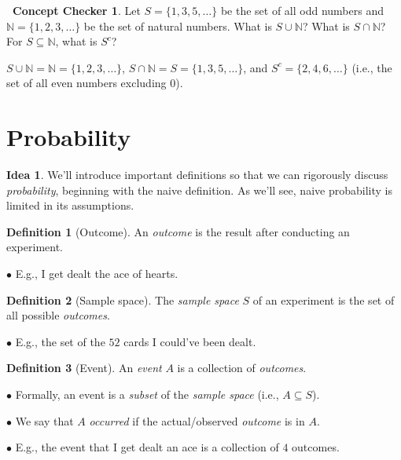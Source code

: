 \documentclass[12pt,oneside]{article}
\theoremstyle{definition}
\newtheorem{definition}{Definition}
\newtheorem{concept}{\faPen \ Concept Checker}
\newtheorem*{idea}{Idea}
\theoremstyle{remark}
\begin{document}
\begin{concept}
Let $S = \{1, 3, 5, \ldots\}$ be the set of all odd numbers and $\mathbb{N} = \{1, 2, 3, \ldots\}$ be the set of natural numbers. What is $S \cup \mathbb{N}$? What is $S \cap \mathbb{N}$? For $S \subseteq \mathbb{N}$, what is $S^c$?
\end{concept}

\begin{solutionbox}
$S \cup \mathbb{N} = \mathbb{N} = \{1, 2, 3, \ldots\}$, $S \cap \mathbb{N} = S = \{1, 3, 5, \ldots\}$, and $S^c = \{2, 4, 6, \ldots\}$ (i.e., the set of all even numbers excluding 0).
\end{solutionbox}

\section{Probability}

\begin{idea}
We'll introduce important definitions so that we can rigorously discuss \textit{probability}, beginning with the naive definition. As we'll see, naive probability is limited in its assumptions.
\end{idea}

\begin{definition}[Outcome]
An \textit{outcome} is the result after conducting an experiment.

$\bullet$ E.g., I get dealt the ace of hearts.
\end{definition}

\begin{definition}[Sample space]
The \textit{sample space} $S$ of an experiment is the set of all possible \textit{outcomes}.

$\bullet$ E.g., the set of the $52$ cards I could've been dealt.
\end{definition}

\begin{definition}[Event]
An \textit{event} $A$ is a collection of \textit{outcomes}.

$\bullet$ Formally, an event is a \textit{subset} of the \textit{sample space} (i.e., $A \subseteq S$).

$\bullet$ We say that $A$ \textit{occurred} if the actual/observed \textit{outcome} is in $A$.

$\bullet$ E.g., the event that I get dealt an ace is a collection of $4$ outcomes.
\end{definition}
\end{document}
